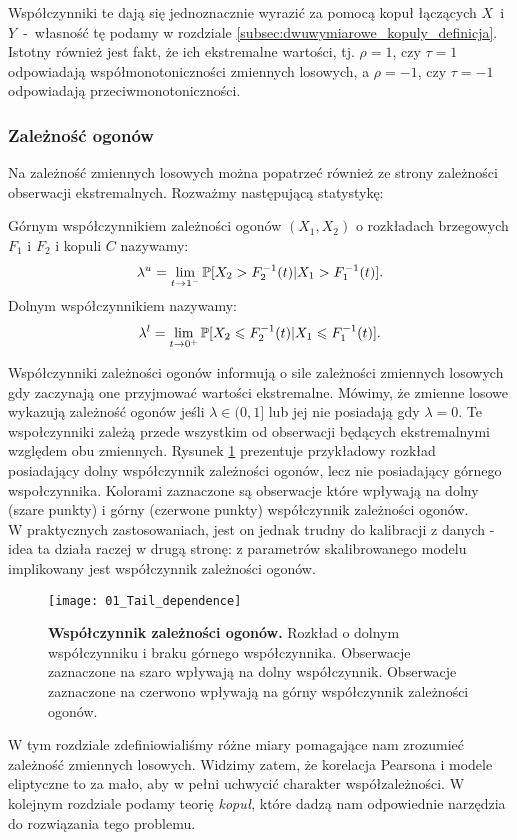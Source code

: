 Współczynniki te dają się jednoznacznie wyrazić za pomocą kopuł łączących $X$~i~$Y$~-~własność tę podamy w rozdziale \ref{subsec:dwuwymiarowe_kopuly_definicja}. Istotny również jest fakt, że ich ekstremalne wartości, tj. $\rho= 1$, czy $\tau=1$ odpowiadają współmonotoniczności zmiennych losowych, a $\rho=-1$, czy $\tau=-1$ odpowiadają przeciwmonotoniczności.

\subsubsection{Zależność ogonów}
Na zależność zmiennych losowych można popatrzeć również ze strony zależności obserwacji ekstremalnych. Rozważmy następującą statystykę:

\begin{df}
	Górnym współczynnikiem zależności ogonów $(X_1, X_2)$ o rozkładach brzegowych $F_1$ i $F_2$ i kopuli $C$ nazywamy:
	$$ \lambda^{u} = \lim\limits_{t\to1^{-}}\mathbb{P}[X_2 > F_2^{-1}(t) \vert X_1 > F_1^{-1}(t) ].$$
	Dolnym współczynnikiem nazywamy:
	$$ \lambda^{l} = \lim\limits_{t\to0^{+}}\mathbb{P}[X_2 \leqslant F_2^{-1}(t) \vert X_1 \leqslant F_1^{-1}(t) ].$$
\end{df}

Współczynniki zależności ogonów informują o sile zależności zmiennych losowych gdy zaczynają one przyjmować wartości ekstremalne. Mówimy, że zmienne losowe wykazują zależność ogonów jeśli $\lambda \in (0, 1]$ lub jej nie posiadają gdy $\lambda =0$. Te wspołczynniki zależą przede wszystkim od obserwacji będących ekstremalnymi względem obu zmiennych. Rysunek \ref{fig:tail_dependence} prezentuje przykładowy rozkład posiadający dolny współczynnik zależności ogonów, lecz nie posiadający górnego wspołczynnika. Kolorami zaznaczone są obserwacje które wpływają na dolny (szare punkty) i górny (czerwone punkty) współczynnik zależności ogonów.\\
W praktycznych zastosowaniach, jest on jednak trudny do kalibracji z danych - idea ta działa raczej w drugą stronę: z parametrów skalibrowanego modelu implikowany jest współczynnik zależności ogonów.
\begin{figure}[H]
	\centering
	\texttt{[image: 01\_Tail\_dependence]}	
	\caption{\textbf{Współczynnik zależności ogonów.} Rozkład o dolnym współczynniku i braku górnego współczynnika. Obserwacje zaznaczone na szaro wpływają na dolny współczynnik. Obserwacje zaznaczone na czerwono wpływają na górny współczynnik zależności ogonów.\label{fig:tail_dependence}}
\end{figure}

W tym rozdziale zdefiniowialiśmy różne miary pomagające nam zrozumieć zależność zmiennych losowych. Widzimy zatem, że korelacja Pearsona i modele eliptyczne to za mało, aby w pełni uchwycić charakter współzależności. W kolejnym rozdziale podamy teorię \emph{kopuł}, które dadzą nam odpowiednie narzędzia do rozwiązania tego problemu.